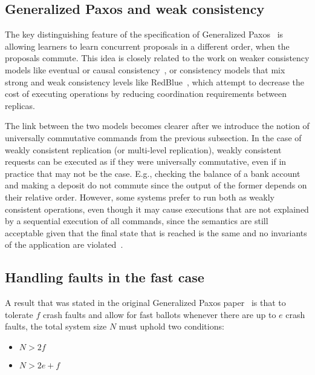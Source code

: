 
\subsection{Generalized Paxos and weak consistency}


The key distinguishing feature of the specification of Generalized
Paxos~\cite{Lamport2005} is allowing learners to learn concurrent
proposals in a different order, when the proposals commute. This idea
is closely related to the work on weaker consistency models like eventual or
causal consistency~\cite{Ahamad1995}, or consistency models that mix
strong and weak consistency levels like RedBlue~\cite{Li2012}, which attempt
to decrease the cost of executing operations by reducing coordination
requirements between replicas. 

The link between the two models becomes clearer after we introduce the
notion of universally commutative commands from the previous subsection.
In the case of weakly consistent replication (or multi-level replication),
weakly consistent requests can be executed as if they were universally
commutative, even if in practice that may not be the case. E.g., checking 
the balance of a bank account and making a deposit do not commute since
the output of the former depends on their relative order. However,
some systems prefer to run both as weakly consistent operations, even
though it may cause executions that are not explained by a sequential
execution of all commands, since the semantics are still acceptable given
that the final state that is reached is the same and no invariants 
of the application are violated~\cite{Li2012}.





\subsection{Handling faults in the fast case}

A result that was stated in the original Generalized Paxos
paper~\cite{Lamport2005} is that to tolerate $f$ crash faults and
allow for fast ballots whenever there are up to $e$ crash faults, the
total system size $N$ must uphold two conditions:
\begin{itemize}
	\item $N > 2f$
	\item $N > 2e+f$
\end{itemize} 

